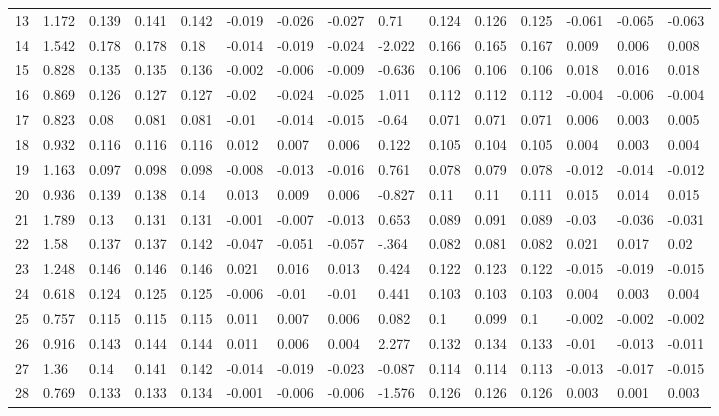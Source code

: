 \begin{table}
\begin{tabular}{|l|l|lll|lll|l|lll|lll}
		13 & 1.172 & 0.139 & 0.141 & 0.142 & -0.019 & -0.026 & -0.027 & 0.71 & 0.124 & 0.126 & 0.125 & -0.061 & -0.065 & -0.063 \\
		14 & 1.542 & 0.178 & 0.178 & 0.18 & -0.014 & -0.019 & -0.024 & -2.022 & 0.166 & 0.165 & 0.167 & 0.009 & 0.006 & 0.008 \\
		15 & 0.828 & 0.135 & 0.135 & 0.136 & -0.002 & -0.006 & -0.009 & -0.636 & 0.106 & 0.106 & 0.106 & 0.018 & 0.016 & 0.018 \\
		16 & 0.869 & 0.126 & 0.127 & 0.127 & -0.02 & -0.024 & -0.025 & 1.011 & 0.112 & 0.112 & 0.112 & -0.004 & -0.006 & -0.004 \\
		17 & 0.823 & 0.08 & 0.081 & 0.081 & -0.01 & -0.014 & -0.015 & -0.64 & 0.071 & 0.071 & 0.071 & 0.006 & 0.003 & 0.005 \\
		18 & 0.932 & 0.116 & 0.116 & 0.116 & 0.012 & 0.007 & 0.006 & 0.122 & 0.105 & 0.104 & 0.105 & 0.004 & 0.003 & 0.004 \\
		19 & 1.163 & 0.097 & 0.098 & 0.098 & -0.008 & -0.013 & -0.016 & 0.761 & 0.078 & 0.079 & 0.078 & -0.012 & -0.014 & -0.012 \\
		20 & 0.936 & 0.139 & 0.138 & 0.14 & 0.013 & 0.009 & 0.006 & -0.827 & 0.11 & 0.11 & 0.111 & 0.015 & 0.014 & 0.015 \\
		21 & 1.789 & 0.13 & 0.131 & 0.131 & -0.001 & -0.007 & -0.013 & 0.653 & 0.089 & 0.091 & 0.089 & -0.03 & -0.036 & -0.031 \\
		22 & 1.58 & 0.137 & 0.137 & 0.142 & -0.047 & -0.051 & -0.057 & -.364 & 0.082 & 0.081 & 0.082 & 0.021 & 0.017 & 0.02 \\
		23 & 1.248 & 0.146 & 0.146 & 0.146 & 0.021 & 0.016 & 0.013 & 0.424 & 0.122 & 0.123 & 0.122 & -0.015 & -0.019 & -0.015 \\
		24 & 0.618 & 0.124 & 0.125 & 0.125 & -0.006 & -0.01 & -0.01 & 0.441 & 0.103 & 0.103 & 0.103 & 0.004 & 0.003 & 0.004 \\
		25 & 0.757 & 0.115 & 0.115 & 0.115 & 0.011 & 0.007 & 0.006 & 0.082 & 0.1 & 0.099 & 0.1 & -0.002 & -0.002 & -0.002 \\
		26 & 0.916 & 0.143 & 0.144 & 0.144 & 0.011 & 0.006 & 0.004 & 2.277 & 0.132 & 0.134 & 0.133 & -0.01 & -0.013 & -0.011 \\
		27 & 1.36 & 0.14 & 0.141 & 0.142 & -0.014 & -0.019 & -0.023 & -0.087 & 0.114 & 0.114 & 0.113 & -0.013 & -0.017 & -0.015 \\
		28 & 0.769 & 0.133 & 0.133 & 0.134 & -0.001 & -0.006 & -0.006 & -1.576 & 0.126 & 0.126 & 0.126 & 0.003 & 0.001 & 0.003 \\

\end{tabular}
\end{table}
